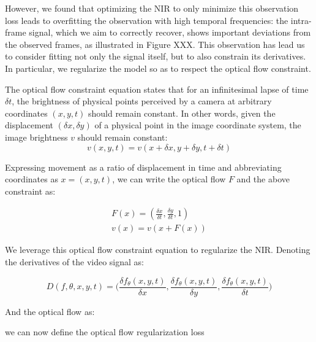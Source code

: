 \documentclass{article}
\begin{document}
However, we found that optimizing the NIR to only minimize this observation loss leads to overfitting the observation with high temporal frequencies:
the intra-frame signal, which we aim to correctly recover, shows important deviations from the observed frames, as illustrated in Figure XXX.
This observation has lead us to consider fitting not only the signal itself, but to also constrain its derivatives.
In particular, we regularize the model so as to respect the optical flow constraint.


The optical flow constraint equation states that for an infinitesimal lapse of time $\delta t$,
the brightness of physical points perceived by a camera at arbitrary coordinates $(x,y,t)$ should remain constant.
In other words, given the displacement $(\delta x, \delta y)$ of a physical point in the image coordinate system,
the image brightness $v$ should remain constant:
\begin{equation}
v(x, y, t)=v(x + \delta x, y + \delta y, t + \delta t)
\end{equation}

Expressing movement as a ratio of displacement in time and abbreviating coordinates as $x=(x,y,t)$,
we can write the optical flow $F$ and the above constraint as:

\begin{equation}
\begin{aligned}
F(x)=(\frac{\delta x}{\delta t}, \frac{\delta y}{\delta t}, 1) \\
v(x)=v(x + F(x))
\end{aligned}
\end{equation}


We leverage this optical flow constraint equation to regularize the NIR.
Denoting the derivatives of the video signal as:

\begin{equation}
D(f, \theta, x, y, t)=\Big(\frac{\delta f_{\theta}(x,y,t)}{\delta x}, \frac{\delta f_{\theta}(x,y,t)}{\delta y}, \frac{\delta f_{\theta}(x,y,t)}{\delta t}\Big)
\end{equation}

And the optical flow as:


we can now define the optical flow regularization loss
\end{document}
